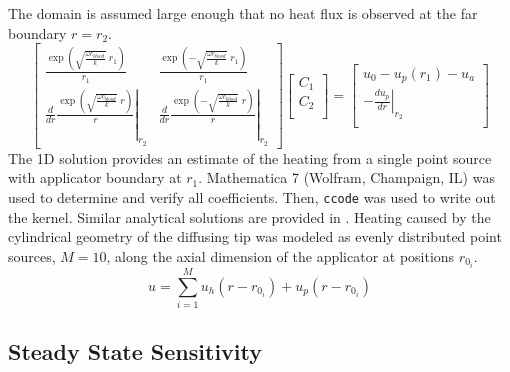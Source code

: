 \documentclass{article}         %
\theoremstyle{definition}
\theoremstyle{remark}
\begin{document}
The domain is assumed large enough that no heat flux is observed at the far boundary $r = r_2$.
\[
\begin{bmatrix}
    \frac{\exp\left( \sqrt{\frac{\omega c_\textit{blood}}{k}} \; r_1 \right)}{r_1}  
  & 
    \frac{\exp\left(-\sqrt{\frac{\omega c_\textit{blood}}{k}} \; r_1 \right)}{r_1}  
  \\
  \left.
   \frac{d}{dr}
    \frac{\exp\left( \sqrt{\frac{\omega c_\textit{blood}}{k}} \; r \right)}{r}  
  \right|_{r_2}
  & 
  \left.
   \frac{d}{dr}
    \frac{\exp\left(-\sqrt{\frac{\omega c_\textit{blood}}{k}} \; r \right)}{r}  
  \right|_{r_2}
\end{bmatrix}
\begin{bmatrix}
  C_1 \\
  C_2 \\
\end{bmatrix}
= 
\begin{bmatrix}
      u_0 - u_p(r_1) - u_a    \\
  - \left. \frac{d u_p}{dr} 
  \right|_{r_2}\\
\end{bmatrix}
\]
The 1D solution provides an estimate of the heating from a single point source
with applicator boundary at $r_1$. Mathematica 7 (Wolfram, Champaign, IL) was used
to determine and verify all coefficients. Then, \verb#ccode# was used to write out the kernel.
Similar analytical solutions are provided in \cite{Giordano2010,Vyas1992,Deng2002}.
Heating caused by the cylindrical geometry of the diffusing tip was modeled as
evenly distributed point sources, $M = 10$, along the axial dimension of the
applicator at positions $r_{0_i}$. 
\begin{equation}\label{GreenSuperPosition}
  u = \sum_{i=1}^M u_h( r-r_{0_i}) + u_p( r-r_{0_i})
\end{equation}

\subsection{Steady State Sensitivity}
\end{document}
